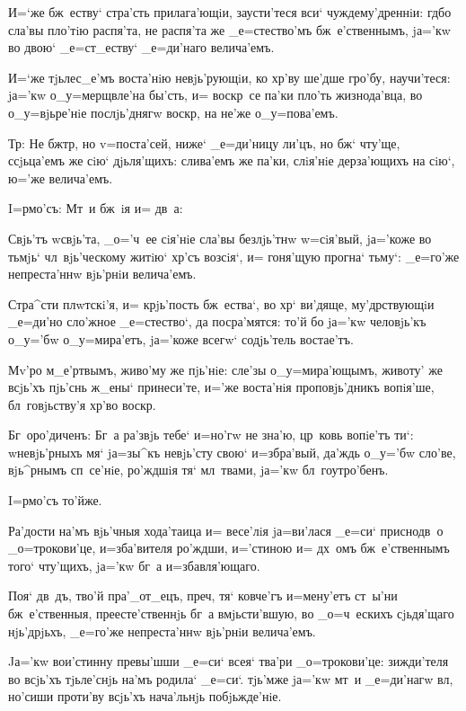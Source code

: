 И=`же бж~еству` стра'сть прилага'ющiи, заусти'теся 
вси` чуждему'дреннiи: гд бо сла'вы пло'тiю распя'та, 
не распя'та же _е=стество'мъ бж~е'ственнымъ, jа='кw во 
двою` _е=ст_еству` _е=ди'наго велича'емъ.

И=`же тjьлес_е'мъ воста'нiю невjь'рующiи, ко хр'ву 
ше'дше гро'бу, научи'теся: jа='кw о_у=мерщвле'на бы'сть, 
и= воскр~се па'ки пло'ть жизнода'вца, во о_у=вjьре'нiе 
послjь'днягw воскр, на не'же о_у=пова'емъ.

Тр: Не бж тр, но v=поста'сей, ниже` 
_е=ди'ницу ли'цъ, но бж` чту'ще, ссjьца'емъ же сiю` 
дjьля'щихъ: слива'емъ же па'ки, слiя'нiе дерза'ющихъ на 
сiю`, ю='же велича'емъ.

 I=рмо'съ: Мт~и бж~iя и= дв~а:

Свjь'тъ w\т свjь'та, _о='ч~ее сiя'нiе сла'вы 
безлjь'тнw w=сiя'вый, jа='коже во тьмjь` чл~вjь'ческому 
житiю` хр'съ возсiя`, и= гоня'щую прогна` тьму`: 
_е=го'же непреста'ннw вjь'рнiи велича'емъ.

Стра^сти плwтскi'я, и= крjь'пость бж~ества`, во 
хр` ви'дяще, му'дрствующiи _е=ди'но сло'жное 
_е=стество`, да посра'мятся: то'й бо jа='кw человjь'къ 
о_у='бw о_у=мира'етъ, jа='коже всегw` содjь'тель 
востае'тъ.

Мv'ро м_е'ртвымъ, живо'му же пjь'нiе: сле'зы 
о_у=мира'ющымъ, животу' же всjь'хъ пjь'снь ж_ены` 
принеси'те, и='же воста'нiя проповjь'дникъ вопiя'ше, 
бл~говjьству'я хр'во воскр.

Бг~оро'диченъ: Бг~а ра'звjь тебе` и=но'гw не зна'ю, 
цр~ковь вопiе'тъ ти`: w\т невjь'рныхъ мя` jа=зы^къ 
невjь'сту свою` и=збра'вый, да'ждь о_у='бw сло'ве, 
вjь^рнымъ сп~се'нiе, ро'ждшiя тя` мл~твами, jа='кw 
бл~гоутро'бенъ.

 I=рмо'съ то'йже.

Ра'дости на'мъ вjь'чныя хода'таица и= весе'лiя 
jа=ви'лася _е=си` приснодв~о _о=трокови'це, и=зба'вителя 
ро'ждши, и='стиною и= дх~омъ бж~е'ственнымъ того` 
чту'щихъ, jа='кw бг~а и=збавля'ющаго.

Поя` дв~дъ, тво'й пра'_от_ецъ, преч, тя` ковче'гъ 
и=мену'етъ ст~ы'ни бж~е'ственныя, преесте'ственнjь бг~а 
вмjьсти'вшую, во _о=ч~ескихъ сjьдя'щаго нjь'дрjьхъ, 
_е=го'же непреста'ннw вjь'рнiи велича'емъ.

Jа='кw вои'стинну превы'шши _е=си` всея` тва'ри 
_о=трокови'це: зижди'теля во всjь'хъ тjьле'снjь на'мъ 
родила` _е=си`. тjь'мже jа='кw мт~и _е=ди'нагw вл, 
но'сиши проти'ву всjь'хъ нача'льнjь побjьжде'нiе.

